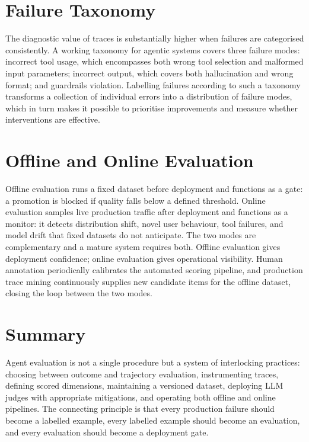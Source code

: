 \section{Failure Taxonomy}

The diagnostic value of traces is substantially higher when failures are categorised 
consistently. A working taxonomy for agentic systems covers three failure modes: incorrect 
tool usage, which encompasses both wrong tool selection and malformed input parameters; 
incorrect output, which covers both hallucination and wrong format; and guardrails 
violation. Labelling failures according to such a taxonomy transforms a collection of 
individual errors into a distribution of failure modes, which in turn makes it possible to 
prioritise improvements and measure whether interventions are effective.
\section{Offline and Online Evaluation}

Offline evaluation runs a fixed dataset before deployment and functions as a gate: a 
promotion is blocked if quality falls below a defined threshold. Online evaluation samples 
live production traffic after deployment and functions as a monitor: it detects distribution 
shift, novel user behaviour, tool failures, and model drift that fixed datasets do not 
anticipate. The two modes are complementary and a mature system requires both. Offline 
evaluation gives deployment confidence; online evaluation gives operational visibility. 
Human annotation periodically calibrates the automated scoring pipeline, and production 
trace mining continuously supplies new candidate items for the offline dataset, closing the 
loop between the two modes.

\section{Summary}

Agent evaluation is not a single procedure but a system of interlocking practices: choosing 
between outcome and trajectory evaluation, instrumenting traces, defining scored dimensions, 
maintaining a versioned dataset, deploying LLM judges with appropriate mitigations, and 
operating both offline and online pipelines. The connecting principle is that every 
production failure should become a labelled example, every labelled example should become 
an evaluation, and every evaluation should become a deployment gate.